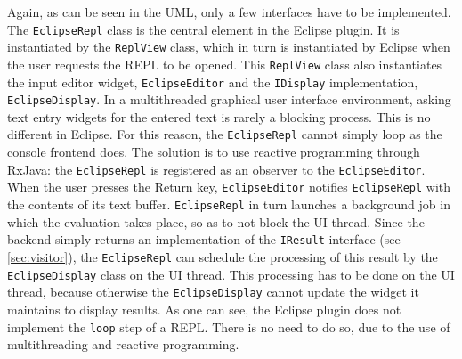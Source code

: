 Again, as can be seen in the UML, only a few interfaces have to be implemented.
The \texttt{EclipseRepl} class is the central element in the Eclipse plugin.
It is instantiated by the \texttt{ReplView} class, which in turn is
instantiated by Eclipse when the user requests the REPL to be opened. This
\texttt{ReplView} class also instantiates the input editor widget,
\texttt{EclipseEditor} and the \texttt{IDisplay} implementation,
\texttt{EclipseDisplay}.
In a multithreaded graphical user interface environment, asking text entry
widgets for the entered text is rarely a blocking process. This is no different
in Eclipse. For this reason, the \texttt{EclipseRepl} cannot simply loop as the
console frontend does. The solution is to use reactive programming through RxJava:
the \texttt{EclipseRepl} is registered as an observer to the
\texttt{EclipseEditor}. When the user presses the Return key,
\texttt{EclipseEditor} notifies \texttt{EclipseRepl} with the contents of its
text buffer. \texttt{EclipseRepl} in turn launches a background job in which the
evaluation takes place, so as to not block the UI thread. Since the backend
simply returns an implementation of the \texttt{IResult} interface (see
\cref{sec:visitor}), the \texttt{EclipseRepl} can schedule the processing of this
result by the \texttt{EclipseDisplay} class on the UI thread. This processing
has to be done on the UI thread, because otherwise the \texttt{EclipseDisplay}
cannot update the widget it maintains to display results.
As one can see, the Eclipse plugin does not implement the \texttt{loop} step of
a REPL. There is no need to do so, due to the use of multithreading and reactive
programming.

